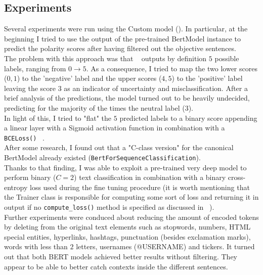 \subsection{Experiments}
\label{subsec:exp}
Several experiments were run using the Custom model (). In particular, at the beginning I tried to use the output 
of the pre-trained BertModel instance to predict the polarity scores after having filtered out the objective sentences. \\
The problem with this approach was that ~\cite{model} outputs by definition $5$ possible labels, ranging from $0 \to 5$. As a consequence,
I tried to map the two lower scores ($0,1$) to the 'negative' label and the upper scores ($4,5$) to the 'positive' label leaving the score
$3$ as an indicator of uncertainty and misclassification. After a brief analysis of the predictions, the model turned out to be heavily 
undecided, predicting for the majority of the times the neutral label ($3$).\\
In light of this, I tried to "flat" the $5$ predicted labels to a binary score appending a linear layer with a Sigmoid activation function
in combination with a \texttt{BCELoss()} ~\cite{bce}. \\
After some research, I found out that a "C-class version" for the canonical BertModel already existed (\texttt{BertForSequenceClassification}).\\
Thanks to that finding, I was able to exploit a pre-trained very deep model to perform binary ($C=2$) text classification in combination with a binary cross-entropy
loss used during the fine tuning procedure (it is worth mentioning that the Trainer class is responsible for computing some sort of loss 
and returning it in output if no \texttt{compute\_loss()} method is specified as discussed in ~\cite{stack}). \\
Further experiments were conduced about reducing the amount of encoded tokens by deleting from the original text elements such as stopwords, numbers,
HTML special entities, hyperlinks, hashtags, punctuation (besides exclamation marks), words with less than $2$ letters, usernames 
(@USERNAME) and tickers. It turned out that both BERT models achieved better results without filtering. They appear to be able to better catch 
contexts inside the different sentences.

